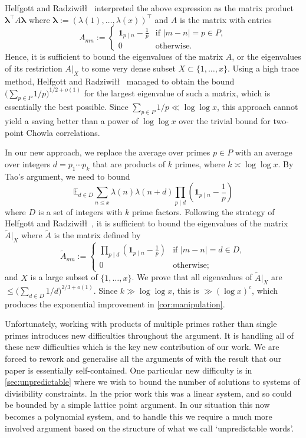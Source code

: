 \documentclass[11pt]{amsart}
\theoremstyle{definition}
\renewcommand{\leq}{\leqslant}
\newcommand{\abs}[1]{\left|#1\right|}
\newcommand{\ind}[1]{\mathbf{1}_{#1}}
\newcommand{\E}{\mathbb{E}}
\renewcommand{\vec}{\boldsymbol}
\begin{document}
Helfgott and Radziwi\l\l~\cite{HR} interpreted the above expression as the matrix product $\vec{\lambda}^{\!\top}\!A\vec{\lambda}$ where $\vec{\lambda} := (\lambda(1), \ldots, \lambda(x))^{\top}$ and $A$ is the matrix with entries 
\begin{equation*}
	A_{mn} := \begin{cases} \ind{p\mid n}-\frac{1}{p} &\text{if }\abs{m-n}=p\in P,\\ 0&\text{otherwise.}\end{cases}
\end{equation*}
Hence, it is sufficient to bound the eigenvalues of the matrix $A$, or the eigenvalues of its restriction $A|_{X}$ to some very dense subset $X \subset \{1, \ldots, x\}$. Using a high trace method, Helfgott and Radziwi\l\l~\cite{HR} managed to obtain the bound $\big(\sum_{p\in P}1/p \big)^{1/2+o(1)}$ for the largest eigenvalue of such a matrix, which is essentially the best possible. Since $\sum_{p\in P}1/p \ll \log \log x$, this approach cannot yield a saving better than a power of $\log \log x$ over the trivial bound for two-point Chowla correlations.

In our new approach, we replace the average over primes $p\in P$ with an average over integers $d = p_1\cdots p_k$ that are products of $k$ primes, where $k\asymp \log \log x$. By Tao's argument, we need to bound
\begin{equation*}
	\E_{d\in D} \sum_{n\leq x} \lambda(n) \lambda(n+d) \prod_{p\mid d} \left(\ind{p\mid n} - \frac{1}{p}\right)
\end{equation*}
where $D$ is a set of integers with $k$ prime factors. Following the strategy of Helfgott and Radziwi\l\l~\cite{HR}, it is sufficient to bound the eigenvalues of the matrix $\widetilde{A}|_X$ where $\widetilde{A}$ is the matrix defined by 
\begin{equation*}
	\widetilde{A}_{mn} := \begin{cases} \prod_{p\mid d}\left(\ind{p\mid n}-\frac{1}{p}\right) &\text{if }\abs{m-n}=d\in D,\\ 0&\text{otherwise;}\end{cases}
\end{equation*}
and $X$ is a large subset of $\{1, \ldots, x\}$. We prove that all eigenvalues of $\widetilde{A}|_X$ are $\leq \big(\sum_{d\in D}1/d \big)^{2/3+o(1)}$. Since $k\gg \log\log x$, this is $\gg (\log x)^{c}$, which produces the exponential improvement in \cref{cor:manipulation}.

Unfortunately, working with products of multiple primes rather than single primes introduces new difficulties throughout the argument. It is handling all of these new difficulties which is the key new contribution of our work. We are forced to rework and generalise all the arguments of \cite{HR} with the result that our paper is essentially self-contained. One particular new difficulty is in \cref{sec:unpredictable} where we wish to bound the number of solutions to systems of divisibility constraints. In the prior work this was a linear system, and so could be bounded by a simple lattice point argument. In our situation this now becomes a polynomial system, and to handle this we require a much more involved argument based on the structure of what we call `unpredictable words'.
\end{document}
